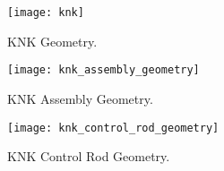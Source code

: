     \begin{figure}
      \centering
      \texttt{[image: knk]}
      \caption{KNK Geometry.}
      \label{fig:knk_geom}
    \end{figure}

    \begin{figure}
      \centering
      \texttt{[image: knk\_assembly\_geometry]}
      \caption{KNK Assembly Geometry.}
      \label{fig:knk_assembly_geom}
    \end{figure}

    \begin{figure}
      \centering
      \texttt{[image: knk\_control\_rod\_geometry]}
      \caption{KNK Control Rod Geometry.}
      \label{fig:knk_cr_geom}
    \end{figure}
    
